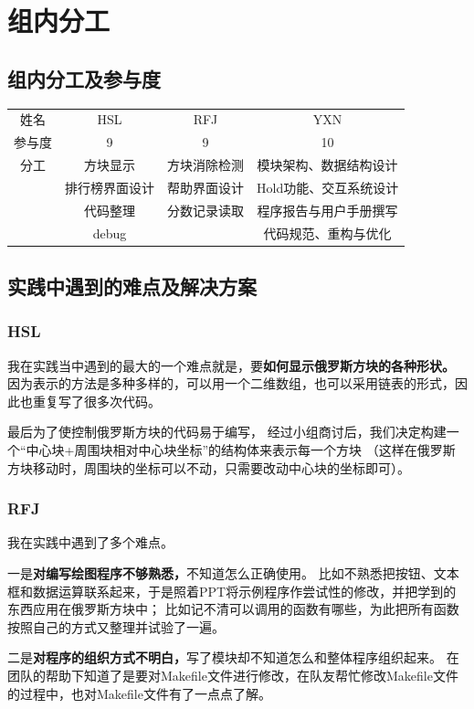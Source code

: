 \documentclass{style/ucasproposal}
\begin{document}
\section{组内分工}
\subsection{组内分工及参与度}
\begin{tabular}{cccc}
\hline
姓名  &     HSL    &     RFJ     &       YXN        \\
参与度 &     9      &       9     &       10           \\
\hline
分工  &  方块显示    &  方块消除检测 & 模块架构、数据结构设计 \\
     & 排行榜界面设计 & 帮助界面设计  & Hold功能、交互系统设计\\
     &   代码整理    &  分数记录读取 & 程序报告与用户手册撰写 \\
     &    debug     &             & 代码规范、重构与优化  \\
\hline
\end{tabular}
\subsection{实践中遇到的难点及解决方案}
\subsubsection{HSL}
我在实践当中遇到的最大的一个难点就是，要\textbf{如何显示俄罗斯方块的各种形状。}
因为表示的方法是多种多样的，可以用一个二维数组，也可以采用链表的形式，因此也重复写了很多次代码。

最后为了使控制俄罗斯方块的代码易于编写，
经过小组商讨后，我们决定构建一个“中心块+周围块相对中心块坐标”的结构体来表示每一个方块
（这样在俄罗斯方块移动时，周围块的坐标可以不动，只需要改动中心块的坐标即可）。

\subsubsection{RFJ}
我在实践中遇到了多个难点。

一是\textbf{对编写绘图程序不够熟悉，}不知道怎么正确使用。
比如不熟悉把按钮、文本框和数据运算联系起来，于是照着PPT将示例程序作尝试性的修改，并把学到的东西应用在俄罗斯方块中；
比如记不清可以调用的函数有哪些，为此把所有函数按照自己的方式又整理并试验了一遍。

二是\textbf{对程序的组织方式不明白，}写了模块却不知道怎么和整体程序组织起来。
在团队的帮助下知道了是要对Makefile文件进行修改，在队友帮忙修改Makefile文件的过程中，也对Makefile文件有了一点点了解。
\end{document}
